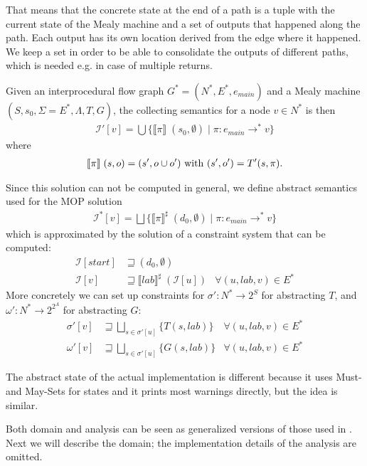 That means that the concrete state at the end of a path is a tuple with the current state of the Mealy machine and a set of outputs that happened along the path. Each output has its own location derived from the edge where it happened. We keep a set in order to be able to consolidate the outputs of different paths, which is needed e.g. in case of multiple returns.

Given an interprocedural flow graph $G^* = (N^*,E^*,e_{main})$ and a Mealy machine $(S, s_0, \Sigma=E^*, \Lambda, T, G)$, the collecting semantics for a node $v \in N^*$ is then
\begin{align}
\mathcal{I}'[v] = \bigcup \{\llbracket \pi \rrbracket \; (s_0, \emptyset) \; | \; \pi : e_{main} \to^* v\}
\end{align}
where
\begin{align}
\llbracket \pi \rrbracket \; (s,o) = (s', o \cup o') \text{ with } (s', o') = T'(s, \pi).
\end{align}

Since this solution can not be computed in general, we define abstract semantics used for the MOP solution
\begin{align}
\mathcal{I}^*[v] = \bigsqcup \{\llbracket \pi \rrbracket^\sharp \; (d_0, \emptyset) \; | \; \pi : e_{main} \to^* v\}
\end{align}
which is approximated by the solution of a constraint system that can be computed:
\begin{align}
\mathcal{I}[start] &\sqsupseteq (d_0, \emptyset)\\
\mathcal{I}[v]	   &\sqsupseteq \llbracket lab \rrbracket^\sharp \; (\mathcal{I}[u])	&\forall (u, lab, v) \in E^*
\end{align}
More concretely we can set up constraints for $\sigma' : N^* \to 2^S$ for abstracting $T$, and $\omega' : N^* \to 2^{2^\Lambda}$ for abstracting $G$:
\begin{align}
\sigma'[v] &\sqsupseteq \bigsqcup_{s\in\sigma'[u]} \{T(s,lab)\}	&\forall (u,lab,v)\in E^*\\
\omega'[v] &\sqsupseteq \bigsqcup_{s\in\sigma'[u]} \{G(s,lab)\}	&\forall (u,lab,v)\in E^*
\end{align}

The abstract state of the actual implementation is different because it uses Must- and May-Sets for states and it prints most warnings directly, but the idea is similar.

Both domain and analysis can be seen as generalized versions of those used in . Next we will describe the domain; the implementation details of the analysis are omitted.


